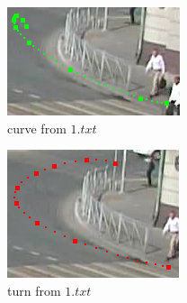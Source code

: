 \begin{figure}[!htb]
	\begin{subfigure}[!htb]{0.32\textwidth}
		\centering{}
		\includegraphics[width=\textwidth]{images/rdp-n-curve-1.png}
		\caption{curve from $1.txt$}
	\end{subfigure}
	\hfill
	\begin{subfigure}[!htb]{0.32\textwidth}
		\centering{}
		\includegraphics[width=\textwidth]{images/rdp-n-turn.png}
		\caption{turn from $1.txt$}
	\end{subfigure}
	\hfill
	\begin{subfigure}[!htb]{0.25\textwidth}
		\centering{}

\end{subfigure}
\end{figure}
